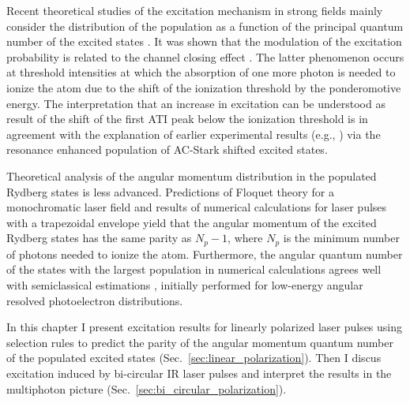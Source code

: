 Recent theoretical studies of the excitation mechanism in strong fields mainly consider the distribution of the population as a function of the principal quantum number of the excited states \cite{li2014,li2014b,zimmermann2017,xiong2017,piraux2017}. It was shown that the modulation of the excitation probability is related to the channel closing effect \cite{krajewska2012,li2014,li2014b,piraux2017}. The latter phenomenon occurs at threshold intensities at which the absorption of one more photon is needed to ionize the atom due to the shift of the ionization threshold by the ponderomotive energy. The interpretation that an increase in excitation can be understood as result of the shift of the first ATI peak below the ionization threshold \cite{li2014,li2014b} is in agreement with the explanation of earlier experimental results (e.g., \cite{freeman1987,jones1992,rottke1994}) via the resonance enhanced population of AC-Stark shifted excited states. 

Theoretical analysis of the angular momentum distribution in the populated Rydberg states is less advanced. Predictions of Floquet theory for a monochromatic laser field \cite{krajewska2012} and results of numerical calculations for laser pulses with a trapezoidal envelope \cite{piraux2017} yield that the angular momentum of the excited Rydberg states has the same parity as $N_p-1$, where $N_p$ is the minimum number of photons needed to ionize the atom. Furthermore, the angular quantum number of the states with the largest population in numerical calculations \cite{li2014,li2014b,piraux2017} agrees well with semiclassical estimations \cite{arbo2008}, initially performed for low-energy angular resolved photoelectron distributions.

In this chapter I present excitation results for linearly polarized laser pulses using selection rules to predict the parity of the angular momentum quantum number of the populated excited states (Sec.~\ref{sec:linear_polarization}). Then I discus excitation induced by bi-circular IR laser pulses and interpret the results in the multiphoton picture (Sec.~\ref{sec:bi_circular_polarization}). 

